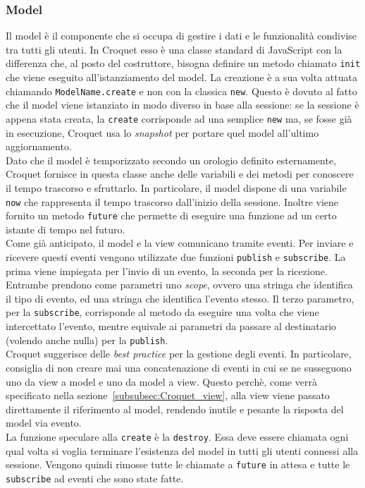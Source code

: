 \subsubsection{Model}\label{subsubsec:Croquet_model}
Il model è il componente che si occupa di gestire i dati e le funzionalità condivise tra tutti gli utenti. In Croquet esso è una classe standard di JavaScript con la differenza
che, al posto del costruttore, bisogna definire un metodo chiamato \texttt{init} che viene eseguito all'istanziamento del model. La creazione è a sua volta attuata chiamando
\texttt{ModelName.create} e non con la classica \texttt{new}. Questo è dovuto al fatto che il model viene istanziato in modo diverso in base alla sessione: se la sessione è appena
stata creata, la \texttt{create} corrisponde ad una semplice \texttt{new} ma, se fosse già in esecuzione, Croquet usa lo \textit{snapshot} per portare quel model all'ultimo 
aggiornamento.\\
\newline
Dato che il model è temporizzato secondo un orologio definito esternamente, Croquet fornisce in questa classe anche delle variabili e dei metodi per conoscere il tempo trascorso e 
sfruttarlo. In particolare, il model dispone di una variabile \texttt{now} che rappresenta il tempo trascorso dall'inizio della sessione. Inoltre viene fornito un metodo \texttt{future}
che permette di eseguire una funzione ad un certo istante di tempo nel futuro.\\
\newline
Come già anticipato, il model e la view comunicano tramite eventi. Per inviare e ricevere questi eventi vengono utilizzate due funzioni \texttt{publish} e \texttt{subscribe}. La prima
viene impiegata per l'invio di un evento, la seconda per la ricezione. Entrambe prendono come parametri uno \textit{scope}, ovvero una stringa che identifica il tipo di
evento, ed una stringa che identifica l'evento stesso. Il terzo parametro, per la \texttt{subscribe}, corrisponde al metodo da eseguire una volta che viene intercettato l'evento, mentre
equivale ai parametri da passare al destinatario (volendo anche nulla) per la \texttt{publish}.\\
Croquet suggerisce delle \textit{best practice} per la gestione degli eventi. In particolare, consiglia di non creare mai una concatenazione di eventi in cui se ne susseguono uno
da view a model e uno da model a view. Questo perchè, come verrà specificato nella sezione~\ref{subsubsec:Croquet_view}, alla view viene passato direttamente il riferimento
al model, rendendo inutile e pesante la risposta del model via evento.\\
\newline
La funzione speculare alla \texttt{create} è la \texttt{destroy}. Essa deve essere chiamata ogni qual volta si voglia terminare l'esistenza del model in tutti gli utenti connessi alla
sessione. Vengono quindi rimosse tutte le chiamate a \texttt{future} in attesa e tutte le \texttt{subscribe} ad eventi che sono state fatte.\\

